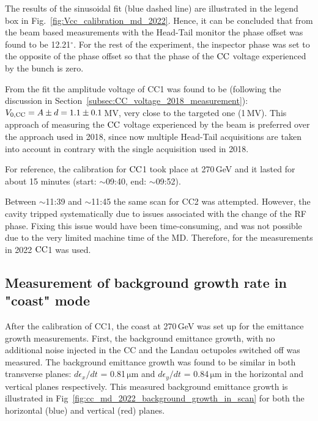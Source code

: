 The results of the sinusoidal fit (blue dashed line) are illustrated in the legend box in Fig.~\ref{fig:Vcc_calibration_md_2022}. Hence, it can be concluded that from the beam based measurements with the Head-Tail monitor the phase offset was found to be 12.21$^\circ$. For the rest of the experiment, the inspector phase was set to the opposite of the phase offset so that the phase of the ${\mathrm{CC}}$ voltage experienced by the bunch is zero. 


From the fit the amplitude voltage of CC1 was found to be (following the discussion in Section~\ref{subsec:CC_voltage_2018_measurement}): ${V_\mathrm{0, CC}}=A \pm d = 1.1 \pm 0.1$\,MV, very close to the targeted one (1\,MV). This approach of measuring the ${\mathrm{CC}}$ voltage experienced by the beam is preferred over the approach used in 2018, since now multiple Head-Tail acquisitions are taken into account in contrary with the single acquisition used in 2018.  



For reference, the calibration for ${\mathrm{CC}}$1 took place at 270\,GeV and it lasted for about 15 minutes (start: $\sim$09:40, end: $\sim$09:52).

Between $\sim$11:39 and $\sim$11:45 the same scan for CC2 was attempted. However, the cavity tripped systematically due to issues associated with the change of the RF phase. Fixing this issue would have been time-consuming, and was not possible due to the very limited machine time of the MD. Therefore, for the measurements in 2022 ${\mathrm{CC}}$1 was used.

\subsection{Measurement of background growth rate in "coast" mode}\label{subsec:measured_background_growth_cc_md_2022}
After the calibration of CC1, the coast at 270\,GeV was set up for the emittance growth measurements. First, the background emittance growth, with no additional noise injected in the CC and the Landau octupoles switched off was measured. The background emittance growth was found to be similar in both transverse planes: $d\epsilon_x /dt$ = 0.81\,$\mathrm{\mu m}$ and $d\epsilon_y /dt$ = 0.84\,$\mathrm{\mu m}$ in the horizontal and vertical planes respectively. This measured background emittance growth is illustrated in Fig~\ref{fig:cc_md_2022_background_growth_in_scan} for both the horizontal (blue) and vertical (red) planes.

